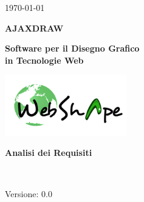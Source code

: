 \usepackage{multirow}


\renewcommand{\insertversion}{0.0} %
\renewcommand{\TITOLODOC}{Analisi dei Requisiti} %

\begin{titlepage}
\begin{center}
	\begin{Large}	\today \end{Large}
\end{center}

\vspace{20pt}

\begin{center}
	\begin{Huge}
				\textbf{AJAXDRAW}
	\end{Huge}
\end{center}			

\begin{center}
	\begin{large}
				\textbf{Software per il Disegno Grafico\\ in Tecnologie Web}
	\end{large}
\end{center}			

\vspace{20pt}

\begin{center}
\includegraphics[width=150pt]{logo}
\end{center}

\vspace{160pt}
\begin{center} %
	\begin{Huge}
				\textbf{\TITOLODOC}
	\end{Huge}
			\\
\end{center}
\vspace{220pt}
\begin{center}
Versione: \insertversion
\end{center}
\end{titlepage}

